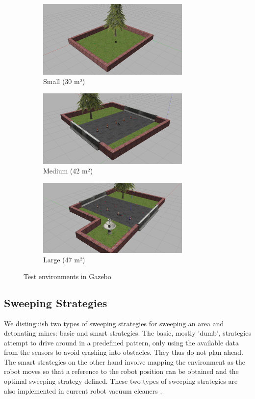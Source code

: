 \documentclass[conference]{IEEEtran}
\begin{document}
\begin{figure}[htbp]
    \centering
        \begin{subfigure}[b]{70mm}
            \centering
            \includegraphics[width=75mm]{W1.png}
            \caption{Small (30 m²)}
            \label{Gazebo-small}
        \end{subfigure}
        \begin{subfigure}[b]{70mm}
            \centering
            \includegraphics[width=75mm]{W2.png}
            \caption{Medium (42 m²)}
            \label{Gazebo-medium}
        \end{subfigure}
        \begin{subfigure}[b]{70mm}
            \centering
            \includegraphics[width=75mm]{W3.png}
            \caption{Large (47 m²)}
            \label{Gazebo-large}
        \end{subfigure}
    \caption{Test environments in Gazebo}
    \label{fig:GazeboEnvironment}
\end{figure}


\subsection{Sweeping Strategies}

We distinguish two types of sweeping strategies for sweeping an area and detonating mines: basic and smart strategies. The basic, mostly 'dumb', strategies attempt to drive around in a predefined pattern, only using the available data from the sensors to avoid crashing into obstacles. They thus do not plan ahead. The smart strategies on the other hand involve mapping the environment as the robot moves so that a reference to the robot position can be obtained and the optimal sweeping strategy defined. These two types of sweeping strategies are also implemented in current robot vacuum cleaners \cite{Casas2006}.\\
\end{document}
